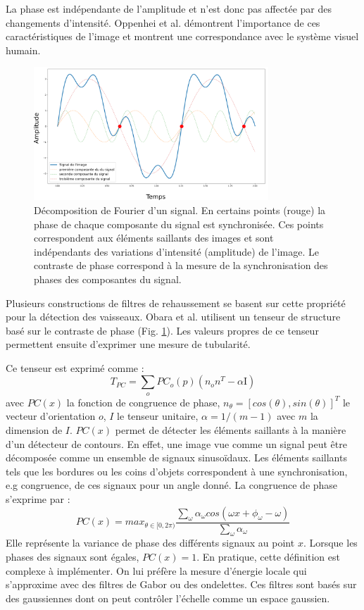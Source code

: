 La phase est indépendante de l'amplitude et n'est donc pas affectée par des changements d'intensité. Oppenhei et al. \cite{Oppenheim1981_phase_importance} démontrent l'importance de ces caractéristiques de l'image et montrent une correspondance avec le système visuel humain. 
\begin{figure}[!ht]
  \centering
  \includegraphics[height=5cm]{Images/PC_decomposition.png}
  \caption{Décomposition de Fourier d'un signal. En certains points (rouge) la phase de chaque composante du signal est synchronisée. Ces points correspondent aux éléments saillants des images et sont indépendants des variations d'intensité (amplitude) de l'image. Le contraste de phase correspond à la mesure de la synchronisation des phases des composantes du signal.}
  \label{fig:phase_congruency}
\end{figure}

Plusieurs constructions de filtres de rehaussement se basent sur cette propriété pour la détection des vaisseaux. Obara et al. \cite{Obara2012_phase} utilisent un tenseur de structure basé sur le contraste de phase (Fig. \ref{fig:phase_congruency}). Les valeurs propres de ce tenseur permettent ensuite d'exprimer une mesure de tubularité.

Ce tenseur est exprimé comme :
\begin{equation}
  T_{PC} = \sum_o PC_{o}(p)(n_{o}n^T - \alpha \text{I})
\end{equation}
avec $PC(x)$ la fonction de congruence de phase, $n_{\theta}=[cos(\theta),sin(\theta)]^T$ le vecteur d'orientation $o$, $I$ le tenseur unitaire, $\alpha = 1/(m-1)$ avec $m$ la dimension de $I$. $PC(x)$ permet de détecter les éléments saillants à la manière d'un détecteur de contours.
En effet, une image vue comme un signal peut être décomposée comme un ensemble de signaux sinusoïdaux. Les éléments saillants tels que les bordures ou les coins d'objets correspondent à une synchronisation, e.g congruence, de ces signaux pour un angle donné. La congruence de phase s'exprime par :
\begin{equation}
  PC(x) = max_{\theta \in [0,2\pi)}  \frac{\sum_\omega \alpha_{\omega}cos(\omega x + \phi_{\omega} - \omega)  }{\sum_\omega \alpha_{\omega} }
\end{equation}
Elle représente la variance de phase des différents signaux au point $x$. Lorsque les phases des signaux sont égales, $PC(x)=1$.
En pratique, cette définition est complexe à implémenter. On lui préfère la mesure d'énergie locale qui s'approxime avec des filtres de Gabor ou des ondelettes. Ces filtres sont basés sur des gaussiennes dont on peut contrôler l'échelle comme un espace gaussien.

